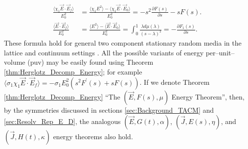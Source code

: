 \documentclass[english,12pt,jmp,graphicx]{revtex4-1}
\begin{document}
%
\begin{align*}
  \frac{\langle\chi_1\vec{E}\cdot\vec{E}_f\rangle}{E_0^2}&=\frac{\langle\chi_1E^2\rangle-\langle\chi_1\vec{E}\cdot\vec{E}_0\rangle}{E_0^2}        
        =-s^2\frac{\partial F(s)}{\partial s}-sF(s).\\
  \frac{\langle\vec{E}\cdot\vec{E}_f\rangle}{E_0^2}&=\frac{\langle E^2\rangle-\langle\vec{E}\cdot\vec{E}_0\rangle}{E_0^2}
     =\int_0^1\frac{\lambda d\mu(\lambda)}{(s-\lambda)^2}=-\frac{\partial F_1(s)}{\partial s}.
\end{align*}
%
These formula hold for general two component stationary random media in
the lattice and continuum settings \cite{Golden:PRL-3935}.
%
All the possible variants of energy per--unit--volume (puv) may be
easily found using Theorem \ref{thm:Herglotz_Decomp_Energy}; for
example $\langle\sigma_1\chi_1\vec{E}\cdot\vec{E}_f\rangle=-\sigma_1E_0^2(s^2F^\prime(s)+sF(s))$. If we
denote Theorem \ref{thm:Herglotz_Decomp_Energy} ``The 
$(\vec{E},F(s),\mu)$ Energy Theorem'', then, by the symmetries discussed in
sections \ref{sec:Background_TACM} and \ref{sec:Resolv_Rep_E_D}, the analogous
$(\vec{E},G(t),\alpha)$, $(\vec{J},E(s),\eta)$, and $(\vec{J},H(t),\kappa)$ energy
theorems also hold.
%


%
%

%



\end{document}
